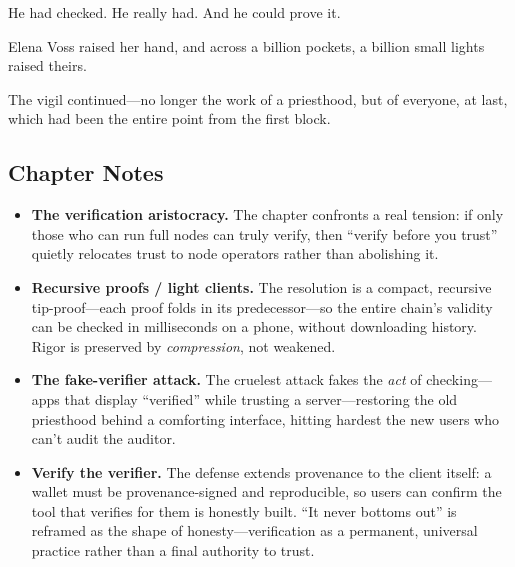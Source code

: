 He had checked. He really had. And he could prove it.

Elena Voss raised her hand, and across a billion pockets, a billion small lights
raised theirs.

The vigil continued---no longer the work of a priesthood, but of everyone, at last,
which had been the entire point from the first block.

\hypertarget{chapter-25-notes}{%
\subsection{Chapter Notes}\label{chapter-25-notes}}

\begin{itemize}
\tightlist
\item
  \textbf{The verification aristocracy.} The chapter confronts a real tension: if
  only those who can run full nodes can truly verify, then ``verify before you
  trust'' quietly relocates trust to node operators rather than abolishing it.
\item
  \textbf{Recursive proofs / light clients.} The resolution is a compact, recursive
  tip-proof---each proof folds in its predecessor---so the entire chain's validity
  can be checked in milliseconds on a phone, without downloading history. Rigor is
  preserved by \emph{compression}, not weakened.
\item
  \textbf{The fake-verifier attack.} The cruelest attack fakes the \emph{act} of
  checking---apps that display ``verified'' while trusting a server---restoring the
  old priesthood behind a comforting interface, hitting hardest the new users who
  can't audit the auditor.
\item
  \textbf{Verify the verifier.} The defense extends provenance to the client itself:
  a wallet must be provenance-signed and reproducible, so users can confirm the tool
  that verifies for them is honestly built. ``It never bottoms out'' is reframed as
  the shape of honesty---verification as a permanent, universal practice rather than
  a final authority to trust.
\end{itemize}
